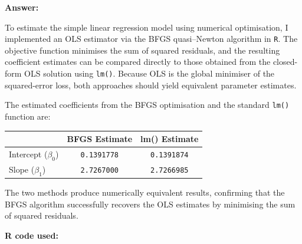 \documentclass[12pt,letterpaper]{article}
\begin{document}
\noindent\textbf{Answer:}

\noindent To estimate the simple linear regression model using numerical optimisation, I implemented an OLS estimator via the BFGS quasi--Newton algorithm in \texttt{R}. The objective function minimises the sum of squared residuals, and the resulting coefficient estimates can be compared directly to those obtained from the closed-form OLS solution using \texttt{lm()}. Because OLS is the global minimiser of the squared-error loss, both approaches should yield equivalent parameter estimates.

\noindent The estimated coefficients from the BFGS optimisation and the standard \texttt{lm()} function are:

\vspace{1em}

\begin{center}
	\begin{tabular}{lcc}
		\hline
		& BFGS Estimate & lm() Estimate \\
		\hline
		Intercept ($\beta_0$) & \texttt{0.1391778} & \texttt{0.1391874} \\
		Slope ($\beta_1$)     & \texttt{2.7267000} & \texttt{2.7266985} \\
		\hline
	\end{tabular}
\end{center}

\vspace{1em}

\noindent The two methods produce numerically equivalent results, confirming that the BFGS algorithm successfully recovers the OLS estimates by minimising the sum of squared residuals.

\vspace{1.5em}

\noindent\textbf{R code used:}


\end{document}
